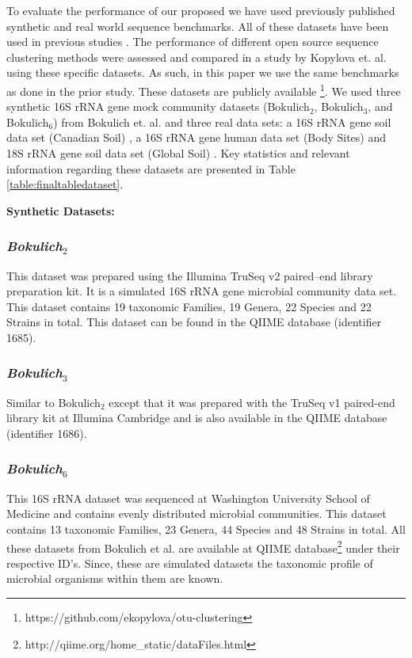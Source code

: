 \documentclass[10pt, conference, compsocconf]{IEEEtran}
\begin{document}

To evaluate the performance of our proposed we have used previously published synthetic and real world sequence benchmarks. All of these datasets have been used in previous studies \cite{MARmockDatasetRef} \cite{MARopenDeNovo}. The performance of different open source sequence clustering methods were assessed and compared in a study by Kopylova et. al. \cite{MARopenDeNovo} using these specific datasets. As such, in this paper we use the same benchmarks as done in the prior study. These datasets are publicly available \footnote{https://github.com/ekopylova/otu-clustering}. We used  three synthetic 16S rRNA gene mock community datasets (Bokulich$_2$, Bokulich$_3$, and Bokulich$_6$) from Bokulich et. al. \cite{MARmockDatasetRef} and three real data sets: a 16S rRNA gene soil data set (Canadian Soil) \cite{MARcanadianSoil}, a 16S rRNA gene human data set (Body Sites) \cite{MARbodySites} and 18S rRNA gene soil data set (Global Soil) \cite{MARglobalSoil}. Key statistics and relevant information regarding these datasets are presented in Table \ref{table:finaltabledataset}. 

\textbf{Synthetic Datasets:}

\subsubsection{\textit{Bokulich$_2$}}
This dataset was prepared using the 
Illumina TruSeq v2 paired--end library
preparation kit. It is a simulated 16S rRNA gene 
microbial community data set.
This 
dataset contains 19 taxonomic Families, 19 Genera, 22 Species 
and 22 Strains in total. This dataset can be 
found in the QIIME database (identifier 1685).

\subsubsection{\textit{Bokulich$_3$}}
Similar to Bokulich$_2$ except that it was 
prepared with the 
TruSeq v1 paired-end library kit at 
Illumina Cambridge and is  also available in the 
QIIME database (identifier 1686).

\subsubsection{\textit{Bokulich$_6$}}
This  16S rRNA dataset 
was sequenced at Washington University School of Medicine and 
contains evenly distributed microbial communities. This 
dataset contains 13 taxonomic 
Families, 23 Genera, 44 Species and 48 Strains in total.
%
All these datasets from Bokulich et al.\cite{MARmockDatasetRef} are 
available at QIIME database\footnote{http://qiime.org/home\_static/dataFiles.html} under their respective ID's. Since, these are simulated 
datasets the taxonomic profile of microbial organisms within them 
are known.
\end{document}
